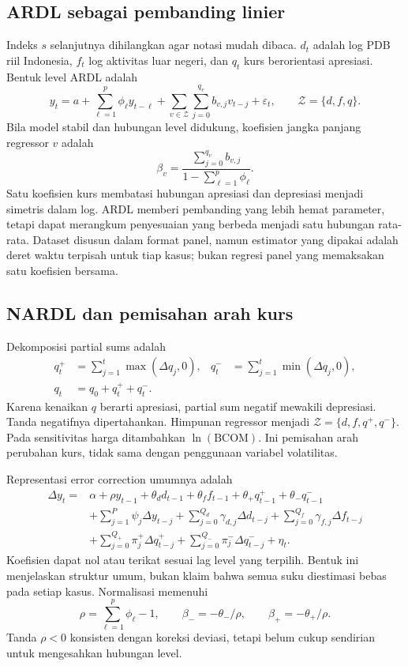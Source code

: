 \subsection{ARDL sebagai pembanding linier}
Indeks $s$ selanjutnya dihilangkan agar notasi mudah dibaca. $d_t$ adalah log PDB riil Indonesia, $f_t$ log aktivitas luar negeri, dan $q_t$ kurs berorientasi apresiasi. Bentuk level ARDL adalah
\begin{equation}
 y_t=a+\sum_{\ell=1}^{p}\phi_\ell y_{t-\ell}
       +\sum_{v\in\mathcal Z}\sum_{j=0}^{q_v}b_{v,j}v_{t-j}+\varepsilon_t,
 \qquad \mathcal Z=\{d,f,q\}.\label{eq:ardl}
\end{equation}
Bila model stabil dan hubungan level didukung, koefisien jangka panjang regressor $v$ adalah
\begin{equation}
 \beta_v=\frac{\sum_{j=0}^{q_v}b_{v,j}}{1-\sum_{\ell=1}^{p}\phi_\ell}.
 \label{eq:lr}
\end{equation}
Satu koefisien kurs membatasi hubungan apresiasi dan depresiasi menjadi simetris dalam log. ARDL memberi pembanding yang lebih hemat parameter, tetapi dapat merangkum penyesuaian yang berbeda menjadi satu hubungan rata-rata. Dataset disusun dalam format panel, namun estimator yang dipakai adalah deret waktu terpisah untuk tiap kasus; bukan regresi panel yang memaksakan satu koefisien bersama.

\subsection{NARDL dan pemisahan arah kurs}
Dekomposisi partial sums adalah
\begin{align}
 q_t^+&=\sum_{j=1}^{t}\max(\Delta q_j,0),&
 q_t^-&=\sum_{j=1}^{t}\min(\Delta q_j,0),\\
 q_t&=q_0+q_t^++q_t^-.
\end{align}
Karena kenaikan $q$ berarti apresiasi, partial sum negatif mewakili depresiasi. Tanda negatifnya dipertahankan. Himpunan regressor menjadi $\mathcal Z=\{d,f,q^+,q^-\}$. Pada sensitivitas harga ditambahkan $\ln(\mathrm{BCOM})$. Ini pemisahan arah perubahan kurs, tidak sama dengan penggunaan variabel volatilitas.

Representasi error correction umumnya adalah
\begin{align}
\Delta y_t={}&\alpha+\rho y_{t-1}+\theta_d d_{t-1}+\theta_f f_{t-1}
 +\theta_+q^+_{t-1}+\theta_-q^-_{t-1}\nonumber\\
 &+\sum_{j=1}^{P}\psi_j\Delta y_{t-j}
 +\sum_{j=0}^{Q_d}\gamma_{d,j}\Delta d_{t-j}
 +\sum_{j=0}^{Q_f}\gamma_{f,j}\Delta f_{t-j}\nonumber\\
 &+\sum_{j=0}^{Q_+}\pi_j^+\Delta q^+_{t-j}
 +\sum_{j=0}^{Q_-}\pi_j^-\Delta q^-_{t-j}+\eta_t.
 \label{eq:ecm}
\end{align}
Koefisien dapat nol atau terikat sesuai lag level yang terpilih. Bentuk ini menjelaskan struktur umum, bukan klaim bahwa semua suku diestimasi bebas pada setiap kasus. Normalisasi memenuhi
\begin{equation}
 \rho=\sum_{\ell=1}^{p}\phi_\ell-1,\qquad
 \beta_-=-\theta_-/\rho,\qquad \beta_+=-\theta_+/\rho.
\end{equation}
Tanda $\rho<0$ konsisten dengan koreksi deviasi, tetapi belum cukup sendirian untuk mengesahkan hubungan level.

